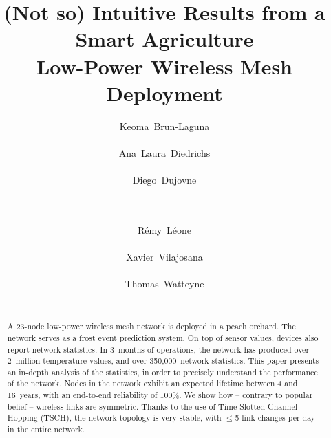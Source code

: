 \documentclass{sig-alternate}
\begin{document}
\title{(Not so) Intuitive Results from a Smart Agriculture\\Low-Power Wireless Mesh Deployment}

\author{
    \alignauthor Keoma~Brun-Laguna\\
        \\
    \alignauthor Ana~Laura~Diedrichs\\
        \\
    \alignauthor Diego~Dujovne\\
        \\
        \\
    \and
    \alignauthor R\'emy~L\'eone\\
        \\
    \alignauthor Xavier~Vilajosana\\
        \\
    \alignauthor Thomas~Watteyne\\
        \\
}

\maketitle

\begin{abstract}
A 23-node low-power wireless mesh network is deployed in a peach orchard.
The network serves as a frost event prediction system.
On top of sensor values, devices also report network statistics.
In 3~months of operations, the network has produced over 2~million temperature values, and over 350,000~network statistics.
This paper presents an in-depth analysis of the statistics, in order to precisely understand the performance of the network.
Nodes in the network exhibit an expected lifetime between 4 and 16~years, with an end-to-end reliability of 100\%.
We show how -- contrary to popular belief -- wireless links are symmetric.
Thanks to the use of Time Slotted Channel Hopping (TSCH), the network topology is very stable, with $\leq$5 link changes per day in the entire network.
\end{abstract}
\end{document}
